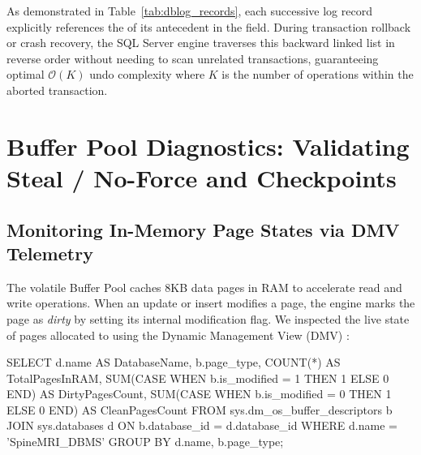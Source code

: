 As demonstrated in Table~\ref{tab:dblog_records}, each successive log record explicitly references the  of its antecedent in the  field. During transaction rollback or crash recovery, the SQL Server engine traverses this backward linked list in reverse order without needing to scan unrelated transactions, guaranteeing optimal $\mathcal{O}(K)$ undo complexity where $K$ is the number of operations within the aborted transaction.

\section{Buffer Pool Diagnostics: Validating Steal / No-Force and Checkpoints}

\subsection{Monitoring In-Memory Page States via DMV Telemetry}
The volatile Buffer Pool caches 8KB data pages in RAM to accelerate read and write operations. When an update or insert modifies a page, the engine marks the page as \textit{dirty} by setting its internal modification flag. We inspected the live state of pages allocated to  using the Dynamic Management View (DMV) :

\begin{SQLCode}
SELECT 
    d.name AS DatabaseName, b.page_type, COUNT(*) AS TotalPagesInRAM,
    SUM(CASE WHEN b.is_modified = 1 THEN 1 ELSE 0 END) AS DirtyPagesCount,
    SUM(CASE WHEN b.is_modified = 0 THEN 1 ELSE 0 END) AS CleanPagesCount
FROM sys.dm_os_buffer_descriptors b
JOIN sys.databases d ON b.database_id = d.database_id
WHERE d.name = 'SpineMRI_DBMS'
GROUP BY d.name, b.page_type;
\end{SQLCode}

